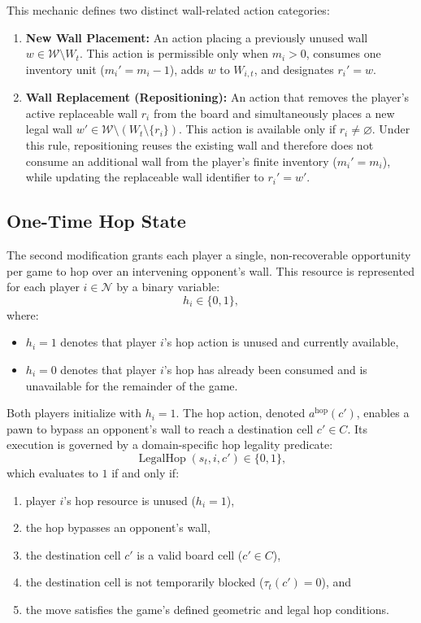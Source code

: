 \documentclass{article}
\begin{document}
This mechanic defines two distinct wall-related action categories:
\begin{enumerate}
    \item \textbf{New Wall Placement:} An action placing a previously unused wall $w \in \mathcal{W} \setminus W_t$. This action is permissible only when $m_i > 0$, consumes one inventory unit ($m_i' = m_i - 1$), adds $w$ to $W_{i,t}$, and designates $r_i' = w$.
    \item \textbf{Wall Replacement (Repositioning):} An action that removes the player's active replaceable wall $r_i$ from the board and simultaneously places a new legal wall $w' \in \mathcal{W} \setminus (W_t \setminus \{r_i\})$. This action is available only if $r_i \ne \varnothing$. Under this rule, repositioning reuses the existing wall and therefore does not consume an additional wall from the player's finite inventory ($m_i' = m_i$), while updating the replaceable wall identifier to $r_i' = w'$.
\end{enumerate}

\subsection{One-Time Hop State}
\label{subsec:hop_state}

The second modification grants each player a single, non-recoverable opportunity per game to hop over an intervening opponent's wall. This resource is represented for each player $i \in \mathcal{N}$ by a binary variable:
\begin{equation}
h_i \in \{0, 1\},
\end{equation}
where:
\begin{itemize}
    \item $h_i = 1$ denotes that player $i$'s hop action is unused and currently available,
    \item $h_i = 0$ denotes that player $i$'s hop has already been consumed and is unavailable for the remainder of the game.
\end{itemize}
Both players initialize with $h_i = 1$. The hop action, denoted $a^{\text{hop}}(c')$, enables a pawn to bypass an opponent's wall to reach a destination cell $c' \in C$. Its execution is governed by a domain-specific hop legality predicate:
\begin{equation}
\operatorname{LegalHop}(s_t, i, c') \in \{0, 1\},
\end{equation}
which evaluates to $1$ if and only if:
\begin{enumerate}
    \item player $i$'s hop resource is unused ($h_i = 1$),
    \item the hop bypasses an opponent's wall,
    \item the destination cell $c'$ is a valid board cell ($c' \in C$),
    \item the destination cell is not temporarily blocked ($\tau_t(c') = 0$), and
    \item the move satisfies the game's defined geometric and legal hop conditions.
\end{enumerate}
\end{document}
